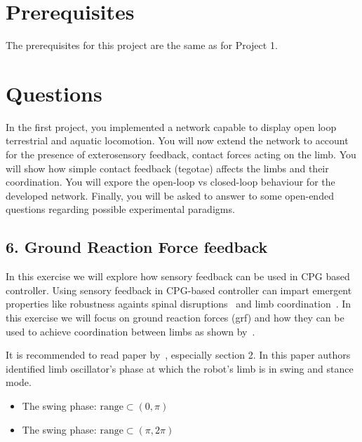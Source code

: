 \documentclass{cmc}
\begin{document}

\section*{Prerequisites}
The prerequisites for this project are the same as for Project 1.

\newpage
\section*{Questions}

In the first project, you implemented a network capable to display open loop terrestrial and aquatic locomotion.
You will now extend the network to account
for the presence of exterosensory feedback, contact forces
acting on the limb. You will show how simple contact feedback  (tegotae) affects the limbs and their coordination.
You will expore the open-loop vs closed-loop behaviour for the developed network.
Finally, you will be asked to answer to some open-ended questions regarding possible experimental paradigms.

\newpage
\subsection*{6. Ground Reaction Force feedback}\label{sec:grf-feedback}

In this exercise we will explore how sensory feedback can be used in CPG based controller. Using sensory feedback
in CPG-based controller can impart emergent properties like robustness againts spinal disruptions~\cite{thandiackal2021emergence}
and limb coordination~\cite{owaki2013simple}. In this exercise we will focus on ground reaction forces (grf) and how they can be
used to achieve coordination between limbs as shown by~\cite{owaki2013simple}.

It is recommended to read paper by~\cite{owaki2013simple}, especially section 2. In this paper authors identified
limb oscillator's phase at which the robot's limb is in swing and stance mode.

\begin{itemize}
  \item The swing phase: $ \text{range} \subset (0, \pi) $
  \item The swing phase: $ \text{range} \subset (\pi, 2\pi) $
\end{itemize}
\end{document}

